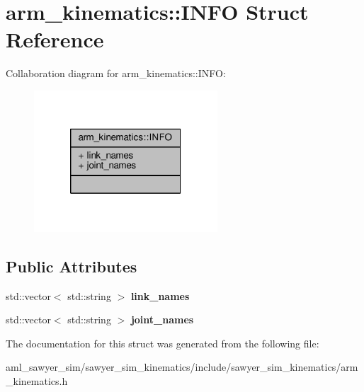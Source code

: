 \hypertarget{structarm__kinematics_1_1_i_n_f_o}{\section{arm\-\_\-kinematics\-:\-:I\-N\-F\-O Struct Reference}
\label{structarm__kinematics_1_1_i_n_f_o}
}


Collaboration diagram for arm\-\_\-kinematics\-:\-:I\-N\-F\-O\-:\nopagebreak
\begin{figure}[H]
\begin{center}
\leavevmode
\includegraphics[width=194pt]{structarm__kinematics_1_1_i_n_f_o__coll__graph}
\end{center}
\end{figure}
\subsection*{Public Attributes}
\begin{DoxyCompactItemize}
\item 
\hypertarget{structarm__kinematics_1_1_i_n_f_o_a42c69394d20c2c7205e811870a625fb8}{std\-::vector$<$ std\-::string $>$ {\bfseries link\-\_\-names}}\label{structarm__kinematics_1_1_i_n_f_o_a42c69394d20c2c7205e811870a625fb8}

\item 
\hypertarget{structarm__kinematics_1_1_i_n_f_o_a157c678ee40e35769f01b40395e5b29b}{std\-::vector$<$ std\-::string $>$ {\bfseries joint\-\_\-names}}\label{structarm__kinematics_1_1_i_n_f_o_a157c678ee40e35769f01b40395e5b29b}

\end{DoxyCompactItemize}


The documentation for this struct was generated from the following file\-:\begin{DoxyCompactItemize}
\item 
aml\-\_\-sawyer\-\_\-sim/sawyer\-\_\-sim\-\_\-kinematics/include/sawyer\-\_\-sim\-\_\-kinematics/arm\-\_\-kinematics.\-h\end{DoxyCompactItemize}
